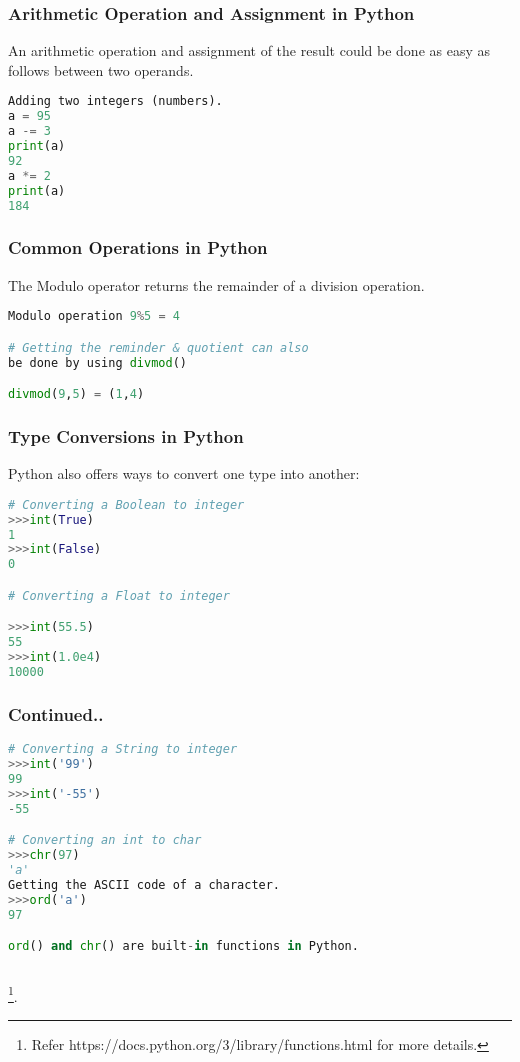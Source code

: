\documentclass{beamer}
\begin{document}
\begin{frame}[fragile]
\frametitle{Arithmetic Operation and Assignment in Python}
An arithmetic operation and assignment of the result could be done as easy as follows between two operands.

\begin{lstlisting}[language=Python]
Adding two integers (numbers).
a = 95
a -= 3
print(a)
92
a *= 2
print(a)
184
\end{lstlisting}
\end{frame}

\begin{frame}[fragile]
\frametitle{Common Operations in Python}
The Modulo operator returns the remainder of a division operation.
\begin{lstlisting}[language=Python]
Modulo operation 9%5 = 4

# Getting the reminder & quotient can also 
be done by using divmod()

divmod(9,5) = (1,4)

\end{lstlisting}
\end{frame}

\begin{frame}[fragile]
\frametitle{Type Conversions in Python}
Python also offers ways to convert one type into another:

\begin{lstlisting}[language=Python]
# Converting a Boolean to integer
>>>int(True)
1
>>>int(False)
0

# Converting a Float to integer

>>>int(55.5)
55
>>>int(1.0e4)
10000

\end{lstlisting}
\end{frame}
\begin{frame}[fragile]
\frametitle{Continued..}
\begin{lstlisting}[language=Python]
# Converting a String to integer
>>>int('99')
99
>>>int('-55')	
-55

# Converting an int to char
>>>chr(97)
'a'
Getting the ASCII code of a character.
>>>ord('a')
97

ord() and chr() are built-in functions in Python.
 
\end{lstlisting}
\footnote{\tiny{Refer https://docs.python.org/3/library/functions.html for more details.}}.
\end{frame}
\end{document}
